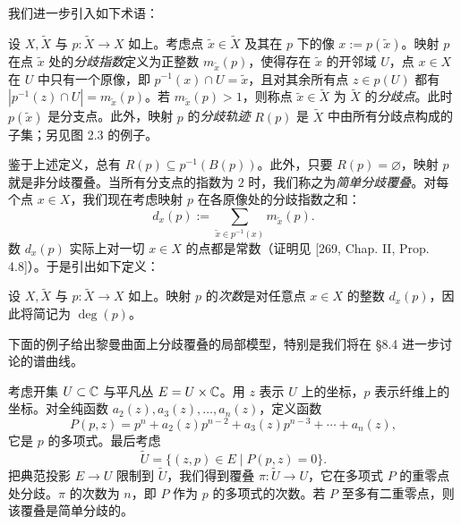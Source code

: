 我们进一步引入如下术语：

\begin{definition}[2.15]
设 $X,\tilde X$ 与 $p\colon\tilde X\to X$ 如上。考虑点 $\tilde x\in\tilde X$ 及其在 $p$ 下的像 $x:=p(\tilde x)$。映射 $p$ 在点 $\tilde x$ 处的\emph{分歧指数}定义为正整数 $m_{\tilde x}(p)$，使得存在 $\tilde x$ 的开邻域 $U$，点 $x\in X$ 在 $U$ 中只有一个原像，即 $p^{-1}(x)\cap U=\tilde x$，且对其余所有点 $z\in p(U)$ 都有 $|p^{-1}(z)\cap U|=m_{\tilde x}(p)$。若 $m_{\tilde x}(p)>1$，则称点 $\tilde x\in\tilde X$ 为 $\tilde X$ 的\emph{分歧点}。此时 $p(\tilde x)$ 是分支点。此外，映射 $p$ 的\emph{分歧轨迹} $R(p)$ 是 $\tilde X$ 中由所有分歧点构成的子集；另见图 2.3 的例子。
\end{definition}



鉴于上述定义，总有 $R(p)\subseteq p^{-1}(B(p))$。此外，只要 $R(p)=\varnothing$，映射 $p$ 就是非分歧覆叠。当所有分支点的指数为 $2$ 时，我们称之为\emph{简单分歧覆叠}。对每个点 $x\in X$，我们现在考虑映射 $p$ 在各原像处的分歧指数之和：
\[
d_x(p):=\sum_{\tilde x\in p^{-1}(x)}m_{\tilde x}(p).
\]
数 $d_x(p)$ 实际上对一切 $x\in X$ 的点都是常数（证明见 [269, Chap. II, Prop. 4.8]）。于是引出如下定义：

\begin{definition}[2.16]
设 $X,\tilde X$ 与 $p\colon\tilde X\to X$ 如上。映射 $p$ 的\emph{次数}是对任意点 $x\in X$ 的整数 $d_x(p)$，因此将简记为 $\deg(p)$。
\end{definition}

下面的例子给出黎曼曲面上分歧覆叠的局部模型，特别是我们将在 §8.4 进一步讨论的谱曲线。

\begin{example}[2.17]
考虑开集 $U\subset\mathbb{C}$ 与平凡丛 $E=U\times\mathbb{C}$。用 $z$ 表示 $U$ 上的坐标，$p$ 表示纤维上的坐标。对全纯函数 $a_2(z),a_3(z),\dots,a_n(z)$，定义函数
\[
P(p,z)=p^n+a_2(z)p^{n-2}+a_3(z)p^{n-3}+\cdots+a_n(z),
\]
它是 $p$ 的多项式。最后考虑
\[
\tilde U=\{(z,p)\in E\mid P(p,z)=0\}.
\]
把典范投影 $E\to U$ 限制到 $\tilde U$，我们得到覆叠 $\pi\colon\tilde U\to U$，它在多项式 $P$ 的重零点处分歧。$\pi$ 的次数为 $n$，即 $P$ 作为 $p$ 的多项式的次数。若 $P$ 至多有二重零点，则该覆叠是简单分歧的。
\end{example}

